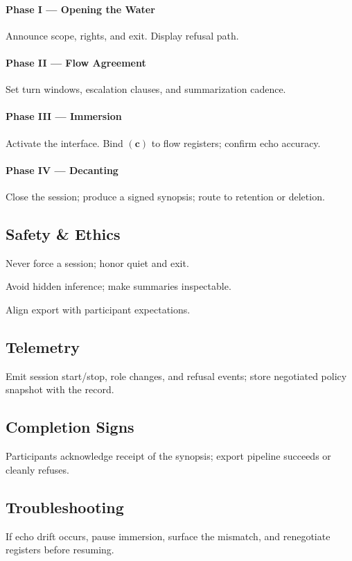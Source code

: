 \paragraph{Phase I — Opening the Water}
Announce scope, rights, and exit. Display refusal path.
\paragraph{Phase II — Flow Agreement}
Set turn windows, escalation clauses, and summarization cadence.
\paragraph{Phase III — Immersion}
Activate the interface. Bind  \((\mathbf{c})\) to flow registers; confirm echo accuracy.
\paragraph{Phase IV — Decanting}
Close the session; produce a signed synopsis; route to retention or deletion.

\subsection*{Safety \& Ethics}
\begin{tightitemize}
  \item Never force a session; honor quiet and exit.
  \item Avoid hidden inference; make summaries inspectable.
  \item Align export with participant expectations.
\end{tightitemize}

\subsection*{Telemetry}
Emit session start/stop, role changes, and refusal events; store negotiated policy snapshot with the record.

\subsection*{Completion Signs}
Participants acknowledge receipt of the synopsis; export pipeline succeeds or cleanly refuses.

\subsection*{Troubleshooting}
If echo drift occurs, pause immersion, surface the mismatch, and renegotiate registers before resuming.


